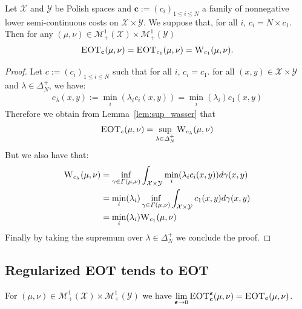 \begin{prop}
Let $\mathcal{X}$ and $\mathcal{Y}$ be Polish spaces and $\mathbf{c}:=(c_i)_{1\leq i\leq N}$ a family of nonnegative lower semi-continuous costs on $\mathcal{X}\times \mathcal{Y}$. We suppose that, for all $i$, $c_i= N\times c_1$. Then for any $(\mu,\nu)\in\mathcal{M}_+^{1}(\mathcal{X})\times\mathcal{M}_+^{1}(\mathcal{Y})$  
\begin{align}
    \textsc{EOT}_{\mathbf{c}}(\mu,\nu)=\textsc{EOT}_{c_1}(\mu,\nu)=\textsc{W}_{c_1}(\mu,\nu).
\end{align}
\end{prop}
\begin{proof}
Let $c:=(c_i)_{1\leq i\leq N}$ such that for all $i$, $c_i=c_1$. for all $(x,y)\in\mathcal{X}\times \mathcal{Y}$ and $\lambda\in\Delta^+_N$, we have:
\begin{align*}
    c_\lambda(x,y):=\min_i(\lambda_i c_i(x,y)) = \min_i(\lambda_i)c_1(x,y)
\end{align*}
Therefore we obtain from Lemma~\ref{lem:sup_wasser} that
\begin{align}
    \textsc{EOT}_{c}(\mu,\nu)=\sup_{\lambda\in\Delta^+_N} \textsc{W}_{c_\lambda}(\mu,\nu)
\end{align}
But we also have that:
\begin{align*}
    \textsc{W}_{c_\lambda}(\mu,\nu)&=\inf_{\gamma\in\Gamma(\mu,\nu)}\int_{\mathcal{X}\times \mathcal{Y}} \min_i(\lambda_i c_i(x,y))d\gamma(x,y)\\
    &=\min_i(\lambda_i )\inf_{\gamma\in\Gamma(\mu,\nu)}\int_{\mathcal{X}\times \mathcal{Y}} c_1(x,y) d\gamma(x,y)\\
    &=\min_i(\lambda_i )  \textsc{W}_{c_1}(\mu,\nu)
\end{align*}
Finally by taking the supremum over $\lambda\in\Delta^+_N$ we conclude the proof.
\end{proof}

\subsection{Regularized EOT tends to EOT}
\label{res:epsto0}

\begin{prop}
\label{prop:epsto0}
For $(\mu,\nu)\in\mathcal{M}_+^{1}(\mathcal{X})\times\mathcal{M}_+^{1}(\mathcal{Y})$ we have $  \lim\limits_{\bm{\varepsilon}\to0} \textsc{EOT}_{\mathbf{c}}^{\bm{\varepsilon}}(\mu,\nu) = \textsc{EOT}_{\mathbf{c}}(\mu,\nu)$.
\end{prop}


